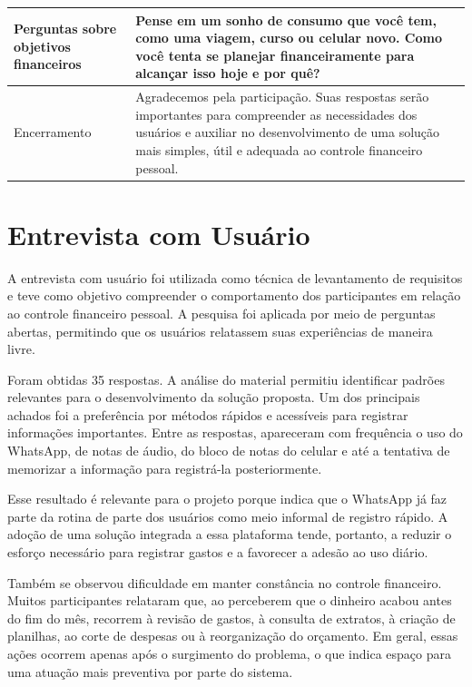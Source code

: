 \begin{table}[H]
\begin{tabularx}{\textwidth}{|p{3.8cm}|X|}
        \hline
        Perguntas sobre objetivos financeiros & Pense em um sonho de consumo que você tem, como uma viagem, curso ou celular novo. Como você tenta se planejar financeiramente para alcançar isso hoje e por quê? \\
        \hline
        Encerramento & Agradecemos pela participação. Suas respostas serão importantes para compreender as necessidades dos usuários e auxiliar no desenvolvimento de uma solução mais simples, útil e adequada ao controle financeiro pessoal. \\
        \hline
    \end{tabularx}
\end{table}

\section{Entrevista com Usuário}

A entrevista com usuário foi utilizada como técnica de levantamento de requisitos e teve como objetivo compreender o comportamento dos participantes em relação ao controle financeiro pessoal. A pesquisa foi aplicada por meio de perguntas abertas, permitindo que os usuários relatassem suas experiências de maneira livre.

Foram obtidas 35 respostas. A análise do material permitiu identificar padrões relevantes para o desenvolvimento da solução proposta. Um dos principais achados foi a preferência por métodos rápidos e acessíveis para registrar informações importantes. Entre as respostas, apareceram com frequência o uso do WhatsApp, de notas de áudio, do bloco de notas do celular e até a tentativa de memorizar a informação para registrá-la posteriormente.

Esse resultado é relevante para o projeto porque indica que o WhatsApp já faz parte da rotina de parte dos usuários como meio informal de registro rápido. A adoção de uma solução integrada a essa plataforma tende, portanto, a reduzir o esforço necessário para registrar gastos e a favorecer a adesão ao uso diário.

Também se observou dificuldade em manter constância no controle financeiro. Muitos participantes relataram que, ao perceberem que o dinheiro acabou antes do fim do mês, recorrem à revisão de gastos, à consulta de extratos, à criação de planilhas, ao corte de despesas ou à reorganização do orçamento. Em geral, essas ações ocorrem apenas após o surgimento do problema, o que indica espaço para uma atuação mais preventiva por parte do sistema.

